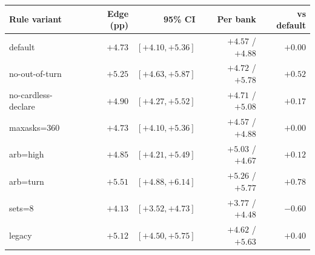 \begin{tabular}{lrrrr}
\toprule
Rule variant & Edge (pp) & 95\% CI & Per bank & vs default \\
\midrule
default & $+4.73$ & $[+4.10, +5.36]$ & $+4.57$ / $+4.88$ & $+0.00$ \\
no-out-of-turn & $+5.25$ & $[+4.63, +5.87]$ & $+4.72$ / $+5.78$ & $+0.52$ \\
no-cardless-declare & $+4.90$ & $[+4.27, +5.52]$ & $+4.71$ / $+5.08$ & $+0.17$ \\
maxasks=360 & $+4.73$ & $[+4.10, +5.36]$ & $+4.57$ / $+4.88$ & $+0.00$ \\
arb=high & $+4.85$ & $[+4.21, +5.49]$ & $+5.03$ / $+4.67$ & $+0.12$ \\
arb=turn & $+5.51$ & $[+4.88, +6.14]$ & $+5.26$ / $+5.77$ & $+0.78$ \\
sets=8 & $+4.13$ & $[+3.52, +4.73]$ & $+3.77$ / $+4.48$ & $-0.60$ \\
legacy & $+5.12$ & $[+4.50, +5.75]$ & $+4.62$ / $+5.63$ & $+0.40$ \\
\bottomrule
\end{tabular}
